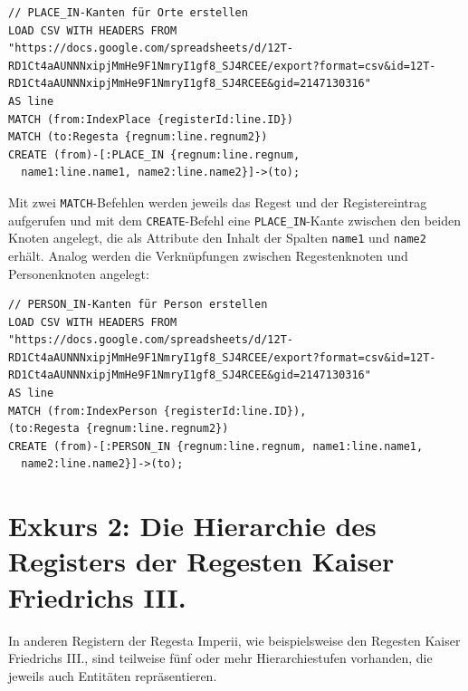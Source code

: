 \documentclass[ngerman,]{scrreprt}
\begin{document}
\begin{verbatim}
// PLACE_IN-Kanten für Orte erstellen
LOAD CSV WITH HEADERS FROM "https://docs.google.com/spreadsheets/d/12T-RD1Ct4aAUNNNxipjMmHe9F1NmryI1gf8_SJ4RCEE/export?format=csv&id=12T-RD1Ct4aAUNNNxipjMmHe9F1NmryI1gf8_SJ4RCEE&gid=2147130316"
AS line
MATCH (from:IndexPlace {registerId:line.ID})
MATCH (to:Regesta {regnum:line.regnum2})
CREATE (from)-[:PLACE_IN {regnum:line.regnum,
  name1:line.name1, name2:line.name2}]->(to);
\end{verbatim}

Mit zwei \texttt{MATCH}-Befehlen werden jeweils das Regest und der Registereintrag aufgerufen und mit dem \texttt{CREATE}-Befehl eine \texttt{PLACE\_IN}-Kante zwischen den beiden Knoten angelegt, die als Attribute den Inhalt der Spalten \texttt{name1} und \texttt{name2} erhält. Analog werden die Verknüpfungen zwischen Regestenknoten und Personenknoten angelegt:

\begin{verbatim}
// PERSON_IN-Kanten für Person erstellen
LOAD CSV WITH HEADERS FROM "https://docs.google.com/spreadsheets/d/12T-RD1Ct4aAUNNNxipjMmHe9F1NmryI1gf8_SJ4RCEE/export?format=csv&id=12T-RD1Ct4aAUNNNxipjMmHe9F1NmryI1gf8_SJ4RCEE&gid=2147130316"
AS line
MATCH (from:IndexPerson {registerId:line.ID}),
(to:Regesta {regnum:line.regnum2})
CREATE (from)-[:PERSON_IN {regnum:line.regnum, name1:line.name1,
  name2:line.name2}]->(to);
\end{verbatim}

\hypertarget{exkurs-2-die-hierarchie-des-registers-der-regesten-kaiser-friedrichs-iii.}{%
\section{Exkurs 2: Die Hierarchie des Registers der Regesten Kaiser Friedrichs III.}\label{exkurs-2-die-hierarchie-des-registers-der-regesten-kaiser-friedrichs-iii.}}

In anderen Registern der Regesta Imperii, wie beispielsweise den Regesten Kaiser Friedrichs III., sind teilweise fünf oder mehr Hierarchiestufen vorhanden, die jeweils auch Entitäten repräsentieren.
\end{document}
